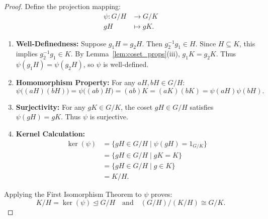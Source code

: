 \begin{proof}
Define the projection mapping:
\begin{align*}
\psi: G/H &\longrightarrow G/K \\
gH &\longmapsto gK.
\end{align*}
\begin{enumerate}[label=\arabic*., leftmargin=*]
    \item \textbf{Well-Definedness:}
    Suppose $g_1 H = g_2 H$.
    Then $g_2^{-1}g_1 \in H$.
    Since $H \subseteq K$, this implies $g_2^{-1}g_1 \in K$.
    By Lemma~\ref{lem:coset_props}(iii), $g_1 K = g_2 K$.
    Thus $\psi(g_1 H) = \psi(g_2 H)$, so $\psi$ is well-defined.

    \item \textbf{Homomorphism Property:}
    For any $aH, bH \in G/H$:
    \begin{equation*}
    \psi\bigl((aH)(bH)\bigr) = \psi\bigl((ab)H\bigr) = (ab)K = (aK)(bK) = \psi(aH)\psi(bH).
    \end{equation*}

    \item \textbf{Surjectivity:}
    For any $gK \in G/K$, the coset $gH \in G/H$ satisfies $\psi(gH) = gK$. Thus $\psi$ is surjective.

    \item \textbf{Kernel Calculation:}
    \begin{align*}
    \ker(\psi) &= \{ gH \in G/H \mid \psi(gH) = 1_{G/K} \} \\
    &= \{ gH \in G/H \mid gK = K \} \\
    &= \{ gH \in G/H \mid g \in K \} \\
    &= K/H.
    \end{align*}
\end{enumerate}
Applying the First Isomorphism Theorem to $\psi$ proves:
\begin{equation*}
K/H = \ker(\psi) \trianglelefteq G/H \quad \text{and} \quad (G/H)/(K/H) \cong G/K.
\end{equation*}
\end{proof}

